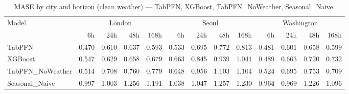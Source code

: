 \begin{table}[ht!]
\centering
\caption{MASE by city and horizon (clean weather) — TabPFN, XGBoost, TabPFN\_NoWeather, Seasonal\_Naive.}
\label{tab:mase_by_city_horizon}
{\small
\setlength{\tabcolsep}{3pt}
\scriptsize
\begin{tabular}{lrrrrrrrrrrrr}
\toprule
Model & \multicolumn{4}{c}{London} & \multicolumn{4}{c}{Seoul} & \multicolumn{4}{c}{Washington} \\
  & 6h & 24h & 48h & 168h & 6h & 24h & 48h & 168h & 6h & 24h & 48h & 168h \\
\midrule
TabPFN & 0.470 & 0.610 & 0.637 & 0.593 & 0.533 & 0.695 & 0.772 & 0.813 & 0.481 & 0.601 & 0.658 & 0.599 \\
XGBoost & 0.547 & 0.629 & 0.658 & 0.679 & 0.663 & 0.845 & 0.939 & 1.044 & 0.489 & 0.663 & 0.720 & 0.732 \\
TabPFN\_NoWeather & 0.514 & 0.708 & 0.760 & 0.779 & 0.648 & 0.956 & 1.103 & 1.104 & 0.524 & 0.695 & 0.753 & 0.709 \\
Seasonal\_Naive & 0.997 & 1.003 & 1.256 & 1.191 & 1.038 & 1.047 & 1.257 & 1.230 & 0.964 & 0.969 & 1.226 & 1.096 \\
\bottomrule
\end{tabular}
}
\end{table}
